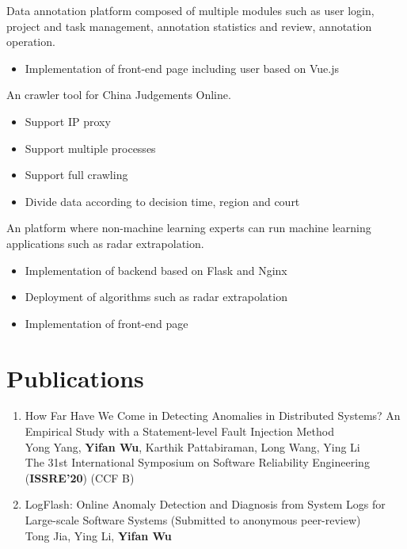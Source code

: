 \documentclass{resume}
\begin{document}
Data annotation platform composed of multiple modules such as user login, project and task management, annotation statistics and review, annotation operation.
\begin{itemize}
  \item Implementation of front-end page including user based on Vue.js
\end{itemize}

An crawler tool for China Judgements Online.
\begin{itemize}
  \item Support IP proxy
  \item Support multiple processes
  \item Support full crawling
  \item Divide data according to decision time, region and court
\end{itemize}

An platform where non-machine learning experts can run machine learning applications such as radar extrapolation.
\begin{itemize}
  \item Implementation of backend based on Flask and Nginx
  \item Deployment of algorithms such as radar extrapolation
  \item Implementation of front-end page
\end{itemize}

\section{Publications}
\begin{enumerate}[parsep=0.5ex]
  \item How Far Have We Come in Detecting Anomalies in Distributed Systems? An Empirical Study with a Statement-level Fault Injection Method\\
  Yong Yang, \textbf{Yifan Wu}, Karthik Pattabiraman, Long Wang, Ying Li\\
  The 31st International Symposium on Software Reliability Engineering (\textbf{ISSRE'20}) (CCF B)
\item LogFlash: Online Anomaly Detection and Diagnosis from System Logs for Large-scale Software Systems (Submitted to anonymous peer-review)\\
  Tong Jia, Ying Li, \textbf{Yifan Wu}\\
\end{enumerate}
\end{document}
